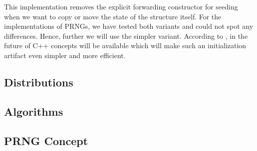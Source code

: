 \documentclass{stdlocal}
\begin{document}
    This implementation removes the explicit forwarding constructor for seeding when we want to copy or move the state of the structure itself.
    For the implementations of PRNGs, we have tested both variants and could not spot any differences.
    Hence, further we will use the simpler variant.
    According to \textcite{vandevoorde2018}, in the future of C++ concepts will be available which will make such an initialization artifact even simpler and more efficient.

  \subsection{Distributions} %
  \label{sub:distributions}

  \subsection{Algorithms} %
  \label{sub:algorithms}


  \subsection{PRNG Concept} %
  \label{sub:prng_concept}

\end{document}
